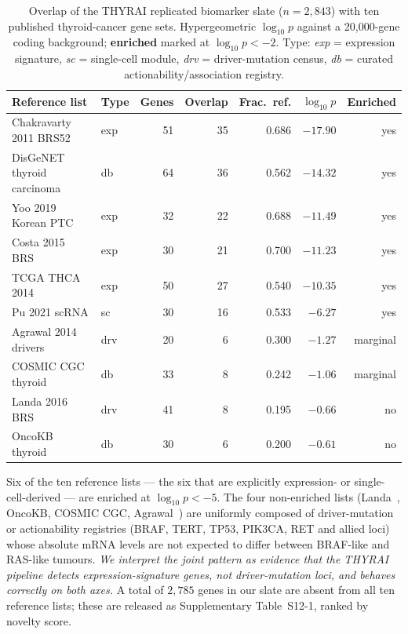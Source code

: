 \begin{table}[h]
\centering
\caption{Overlap of the THYRAI replicated biomarker slate ($n=2{,}843$) with ten published thyroid-cancer gene sets. Hypergeometric $\log_{10} p$ against a 20{,}000-gene coding background; \textbf{enriched} marked at $\log_{10} p < -2$. Type: \emph{exp} = expression signature, \emph{sc} = single-cell module, \emph{drv} = driver-mutation census, \emph{db} = curated actionability/association registry.}
\label{tab:v12-overlap}
\begin{tabular}{llrrrrr}
\hline
Reference list & Type & Genes & Overlap & Frac.\ ref. & $\log_{10} p$ & Enriched \\
\hline
Chakravarty 2011 BRS52        & exp & 51 & 35 & 0.686 & $-17.90$ & yes \\
DisGeNET thyroid carcinoma    & db  & 64 & 36 & 0.562 & $-14.32$ & yes \\
Yoo 2019 Korean PTC           & exp & 32 & 22 & 0.688 & $-11.49$ & yes \\
Costa 2015 BRS                & exp & 30 & 21 & 0.700 & $-11.23$ & yes \\
TCGA THCA 2014                & exp & 50 & 27 & 0.540 & $-10.35$ & yes \\
Pu 2021 scRNA                 & sc  & 30 & 16 & 0.533 & $-6.27$  & yes \\
Agrawal 2014 drivers          & drv & 20 &  6 & 0.300 & $-1.27$  & marginal \\
COSMIC CGC thyroid            & db  & 33 &  8 & 0.242 & $-1.06$  & marginal \\
Landa 2016 BRS                & drv & 41 &  8 & 0.195 & $-0.66$  & no \\
OncoKB thyroid                & db  & 30 &  6 & 0.200 & $-0.61$  & no \\
\hline
\end{tabular}
\end{table}

Six of the ten reference lists --- the six that are explicitly expression- or
single-cell-derived --- are enriched at $\log_{10} p < -5$. The four non-enriched lists
(Landa~\citeyear{landa2016genomic}, OncoKB, COSMIC CGC, Agrawal~\citeyear{agrawal2014integrated})
are uniformly composed of driver-mutation or actionability registries (BRAF, TERT, TP53,
PIK3CA, RET and allied loci) whose absolute mRNA levels are not expected to differ
between BRAF-like and RAS-like tumours. \emph{We interpret the joint pattern as evidence
that the THYRAI pipeline detects expression-signature genes, not driver-mutation loci,
and behaves correctly on both axes.} A total of $2{,}785$ genes in our slate are absent
from all ten reference lists; these are released as Supplementary Table~S12-1, ranked
by novelty score.


